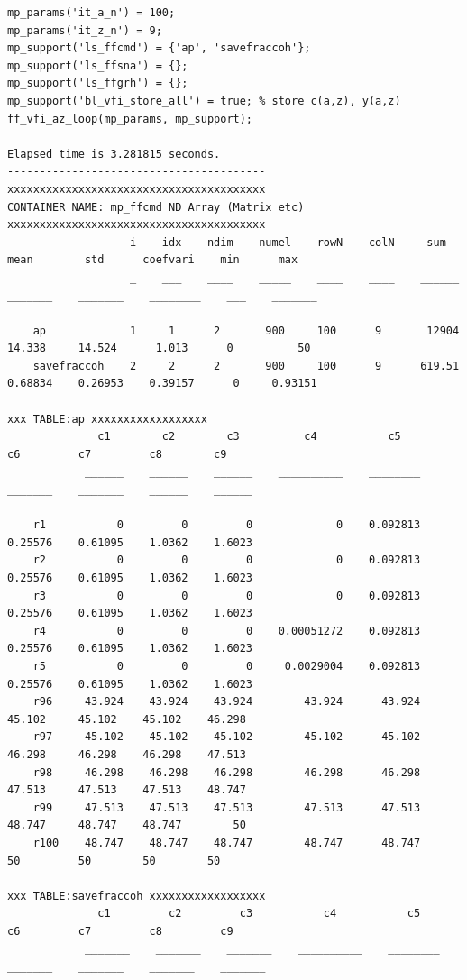 \documentclass[
]{book}
\begin{document}
\begin{verbatim}
mp_params('it_a_n') = 100;
mp_params('it_z_n') = 9;
mp_support('ls_ffcmd') = {'ap', 'savefraccoh'};
mp_support('ls_ffsna') = {};
mp_support('ls_ffgrh') = {};
mp_support('bl_vfi_store_all') = true; % store c(a,z), y(a,z)
ff_vfi_az_loop(mp_params, mp_support);

Elapsed time is 3.281815 seconds.
----------------------------------------
xxxxxxxxxxxxxxxxxxxxxxxxxxxxxxxxxxxxxxxx
CONTAINER NAME: mp_ffcmd ND Array (Matrix etc)
xxxxxxxxxxxxxxxxxxxxxxxxxxxxxxxxxxxxxxxx
                   i    idx    ndim    numel    rowN    colN     sum       mean        std      coefvari    min      max  
                   _    ___    ____    _____    ____    ____    ______    _______    _______    ________    ___    _______

    ap             1     1      2       900     100      9       12904     14.338     14.524      1.013      0          50
    savefraccoh    2     2      2       900     100      9      619.51    0.68834    0.26953    0.39157      0     0.93151

xxx TABLE:ap xxxxxxxxxxxxxxxxxx
              c1        c2        c3          c4           c5         c6         c7         c8        c9  
            ______    ______    ______    __________    ________    _______    _______    ______    ______

    r1           0         0         0             0    0.092813    0.25576    0.61095    1.0362    1.6023
    r2           0         0         0             0    0.092813    0.25576    0.61095    1.0362    1.6023
    r3           0         0         0             0    0.092813    0.25576    0.61095    1.0362    1.6023
    r4           0         0         0    0.00051272    0.092813    0.25576    0.61095    1.0362    1.6023
    r5           0         0         0     0.0029004    0.092813    0.25576    0.61095    1.0362    1.6023
    r96     43.924    43.924    43.924        43.924      43.924     45.102     45.102    45.102    46.298
    r97     45.102    45.102    45.102        45.102      45.102     46.298     46.298    46.298    47.513
    r98     46.298    46.298    46.298        46.298      46.298     47.513     47.513    47.513    48.747
    r99     47.513    47.513    47.513        47.513      47.513     48.747     48.747    48.747        50
    r100    48.747    48.747    48.747        48.747      48.747         50         50        50        50

xxx TABLE:savefraccoh xxxxxxxxxxxxxxxxxx
              c1         c2         c3           c4           c5         c6         c7         c8         c9   
            _______    _______    _______    __________    ________    _______    _______    _______    _______


\end{verbatim}
\end{document}
